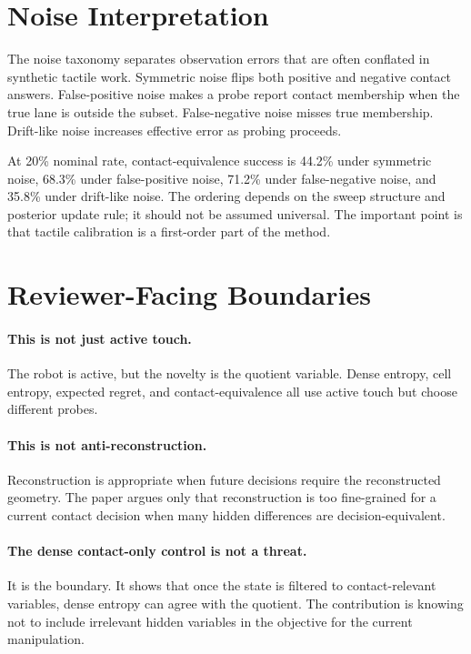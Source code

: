 \documentclass{article}
\begin{document}
\section{Noise Interpretation}

The noise taxonomy separates observation errors that are often conflated in synthetic tactile work. Symmetric noise flips both positive and negative contact answers. False-positive noise makes a probe report contact membership when the true lane is outside the subset. False-negative noise misses true membership. Drift-like noise increases effective error as probing proceeds.

At 20\% nominal rate, contact-equivalence success is 44.2\% under symmetric noise, 68.3\% under false-positive noise, 71.2\% under false-negative noise, and 35.8\% under drift-like noise. The ordering depends on the sweep structure and posterior update rule; it should not be assumed universal. The important point is that tactile calibration is a first-order part of the method.

\section{Reviewer-Facing Boundaries}

\paragraph{This is not just active touch.}
The robot is active, but the novelty is the quotient variable. Dense entropy, cell entropy, expected regret, and contact-equivalence all use active touch but choose different probes.

\paragraph{This is not anti-reconstruction.}
Reconstruction is appropriate when future decisions require the reconstructed geometry. The paper argues only that reconstruction is too fine-grained for a current contact decision when many hidden differences are decision-equivalent.

\paragraph{The dense contact-only control is not a threat.}
It is the boundary. It shows that once the state is filtered to contact-relevant variables, dense entropy can agree with the quotient. The contribution is knowing not to include irrelevant hidden variables in the objective for the current manipulation.
\end{document}
